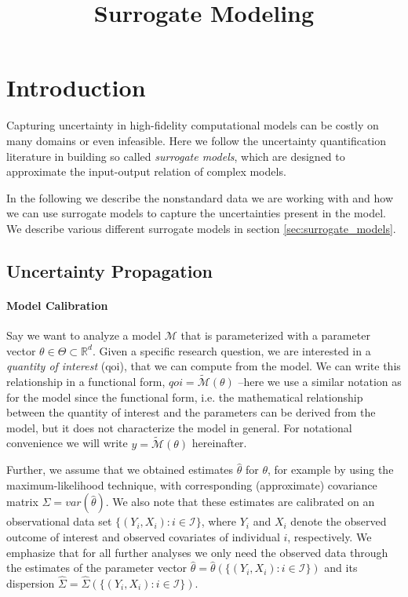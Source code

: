 \documentclass[a4paper, 12pt]{article}
\title{Surrogate Modeling}
\date{}
\begin{document}
\maketitle

\section{Introduction}

Capturing uncertainty in high-fidelity computational models can be costly on many domains or even infeasible.
Here we follow the uncertainty quantification literature in building so called \textit{surrogate models}, which are designed to approximate the input-output relation of complex models.

In the following we describe the nonstandard data we are working with and how we can use surrogate models to capture the uncertainties present in the model.
We describe various different surrogate models in section \ref{sec:surrogate_models}.

\subsection{Uncertainty Propagation}

\paragraph{Model Calibration}

Say we want to analyze a model $\mathcal{M}$ that is parameterized with a parameter vector $\theta \in \Theta \subset \mathbb{R}^d$.
Given a specific research question, we are interested in a \textit{quantity of interest} (qoi), that we can compute from the model.
We can write this relationship in a functional form, $qoi = \tilde{\mathcal{M}}(\theta)$ --here we use a similar notation as for the model since the functional form, i.e. the mathematical relationship between the quantity of interest and the parameters can be derived from the model, but it does not characterize the model in general. For notational convenience we will write $y = \tilde{\mathcal{M}}(\theta)$ hereinafter.

Further, we assume that we obtained estimates $\hat{\theta}$ for $\theta$, for example by using the maximum-likelihood technique, with corresponding (approximate) covariance matrix $\hat{\Sigma} = var(\hat{\theta})$.
We also note that these estimates are calibrated on an observational data set $\{(Y_i, X_i) : i \in \mathcal{I}\}$, where $Y_i$ and $X_i$ denote the observed outcome of interest and observed covariates of individual $i$, respectively.
We emphasize that for all further analyses we only need the observed data through the estimates of the parameter vector $\hat{\theta} = \hat{\theta}(\{(Y_i, X_i) : i \in \mathcal{I}\})$ and its dispersion $\hat{\Sigma} = \hat{\Sigma}(\{(Y_i, X_i) : i \in \mathcal{I}\})$.
\end{document}
